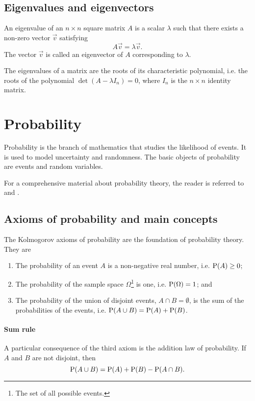\subsection{Eigenvalues and eigenvectors}

An eigenvalue of an $n \times n$ square matrix $A$ is a scalar $\lambda$ such that there exists a
non-zero vector $\vec{v}$ satisfying
\begin{equation}
  \label{eq:eig}
  A \vec{v} = \lambda \vec{v}\text{.}
\end{equation}
The vector $\vec{v}$ is called an eigenvector of $A$ corresponding to $\lambda$.

The eigenvalues of a matrix are the roots of its characteristic polynomial, i.e. the
roots of the polynomial $\det(A - \lambda I_n) = 0$, where $I_n$ is the $n \times n$ identity matrix.

\section{Probability}

Probability is the branch of mathematics that studies the likelihood of events.  It is
used to model uncertainty and randomness.  The basic objects of probability are events
and random variables.

For a comprehensive material about probability theory, the reader is referred to
\textcite{Ross2019} and \textcite{Ross2014}.

\subsection{Axioms of probability and main concepts}

The Kolmogorov axioms of probability are the foundation of probability theory.
They are
\begin{enumerate}
  \item The probability of an event $A$ is a non-negative real number, i.e. $\operatorname{P}(A) \geq 0$;
  \item The probability of the sample space $\Omega$\footnote{The set of all possible
    events.} is one, i.e. $\operatorname{P}(\Omega) = 1$; and
  \item The probability of the union of disjoint events, $A \cap B = \emptyset$, is
    the sum of the probabilities of the events, i.e. $\operatorname{P}(A \cup B) = \operatorname{P}(A) + \operatorname{P}(B)$.
\end{enumerate}

\paragraph{Sum rule}
A particular consequence of the third axiom is the addition law of probability.
If $A$ and $B$ are not disjoint, then
\begin{equation*}
  \operatorname{P}(A \cup B) = \operatorname{P}(A) + \operatorname{P}(B) - \operatorname{P}(A \cap B)\text{.}
\end{equation*}

